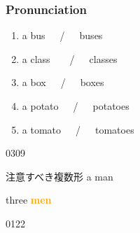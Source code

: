 \documentclass[aspectratio=169,xcolor={dvipsnames,table}]{beamer}
\newcommand{\myaudio}[1]{\href{#1}{\faVolumeUp}}
\begin{document}
\begin{frame}[plain]\frametitle{Pronunciation}

\begin{enumerate}
 \item a bus~~~\pause{}/~~~buses\pause%
\hfill{}\hspace{180pt}\mbox{} \item a class~~~~\pause{}/~~~classes\pause%
\hfill{}\hspace{180pt}\mbox{}
 \item a box~~~\pause{}/~~~boxes\pause%
\hfill{}\hspace{180pt}\mbox{}
 \item a potato~~~\pause{}/~~~potatoes\pause%
\hfill{}\hspace{180pt}\mbox{} \item a tomato~~~\pause{}/~~~tomatoes%
\hfill{}\hspace{180pt}\mbox{}
 \end{enumerate}

\bigskip

\bigskip

\mbox{}\hfill{\tiny 0309}\,{\scriptsize \myaudio{./audio/005_singular_plural_07.mp3}}
\end{frame}
\begin{frame}[plain]{注意すべき複数形}
\scalebox{5}{\ManFace}\hspace{15pt}
\pause
{\LARGE a man}\pause{}
\pause

\bigskip

\bigskip

\scalebox{5}{\ManFace\hspace{5pt}\ManFace\hspace{5pt}\ManFace}\hspace{15pt}
\pause
{\LARGE three  \textcolor{orange}{\bfseries men}}\pause{}

\bigskip

\bigskip

\mbox{}\hfill{\tiny 0122}\,{\scriptsize \myaudio{./audio/005_singular_plural_08.mp3}}
\end{frame}
\end{document}
